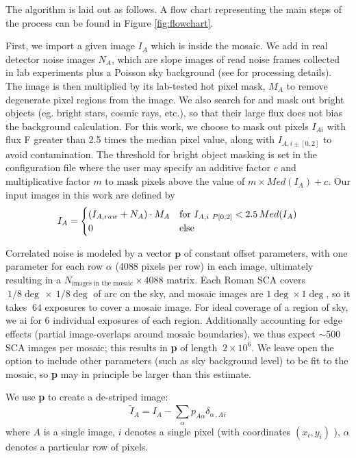 \documentclass[12pt]{pasj01}
\begin{document}
The algorithm is laid out as follows. A flow chart representing the main steps of the process can be found in Figure \ref{fig:flowchart}.

First, we import a given image $I_A$ which is inside the mosaic. We add in real detector noise images $N_A$, which are slope images of read noise frames collected in lab experiments plus a Poisson sky background (see \cite{Laliotis2024} for processing details). The image is then multiplied by its lab-tested hot pixel mask, $M_A$ to remove degenerate pixel regions from the image. We also search for and mask out bright objects (eg. bright stars, cosmic rays, etc.), so that their large flux does not bias the background calculation. For this work, we choose to mask out pixels $I_{Ai}$ with flux F greater than 2.5 times the median pixel value, along with $I_{A,i\pm[0,2]}$ to avoid contamination. The threshold for bright object masking is set in the configuration file where the user may specify an additive factor $c$ and multiplicative factor $m$ to mask pixels above the value of $m\times Med(I_{A})+c$. Our input images in this work are defined by
\begin{equation}I_A = \begin{cases}
(I_{A, \rm{raw}} + N_A ) \cdot M_A & \text{for } I_{A, i\pm[0,2]}<2.5 \,Med(I_{A}) \\
0 & \text{else}
\end{cases}\end{equation}

Correlated noise is modeled by a vector $\textbf{p}$ of constant offset parameters, with one parameter for each row $\alpha$ (4088 pixels per row) in each image, ultimately resulting in a $N_{\text{images in the mosaic}} \times 4088$ matrix. Each Roman SCA covers $~1/8\deg\,\times~1/8\deg$ of arc on the sky, and mosaic images are $1\deg\times1\deg$, so it takes $~64$ exposures to cover a mosaic image. For ideal coverage of a region of sky, we ai for 6 individual exposures of each region. Additionally accounting for edge effects (partial image-overlaps around mosaic boundaries), we thus expect $\sim500$ SCA images per mosaic; this results in \textbf{p} of length $~2\times10^6$. We leave open the option to include other parameters (such as sky background level) to be fit to the mosaic, so \textbf{p} may in principle be larger than this estimate.

We use \textbf{p} to create a de-striped image: \begin{equation} \label{eq:IAi}
    \tilde{I}_{A} = I_{A} - \sum_{\alpha} p_{A\alpha} \delta_{\alpha\,,Ai} 
\end{equation}
where $A$ is a single image, $i$ denotes a single pixel (with coordinates $(x_i, y_i)$ ), $\alpha$ denotes a particular row of pixels.
\end{document}
